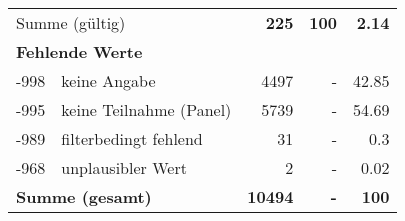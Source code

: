 \begin{longtable}{lXrrr}
     \midrule
     \multicolumn{2}{l}{Summe (gültig)} &
       \textbf{\num{225}} &
     \textbf{100} &
       \textbf{\num[round-mode=places,round-precision=2]{2,14}} \\
     \multicolumn{5}{l}{\textbf{Fehlende Werte}}\\
       -998 &
       keine Angabe &
         \num{4497} &
        - &
         \num[round-mode=places,round-precision=2]{42,85} \\
       -995 &
       keine Teilnahme (Panel) &
         \num{5739} &
        - &
         \num[round-mode=places,round-precision=2]{54,69} \\
       -989 &
       filterbedingt fehlend &
         \num{31} &
        - &
         \num[round-mode=places,round-precision=2]{0,3} \\
       -968 &
       unplausibler Wert &
         \num{2} &
        - &
         \num[round-mode=places,round-precision=2]{0,02} \\
     \midrule
     \multicolumn{2}{l}{\textbf{Summe (gesamt)}} &
          \textbf{\num{10494}} &
        \textbf{-} &
        \textbf{100} \\
     \bottomrule
     \end{longtable}
     
